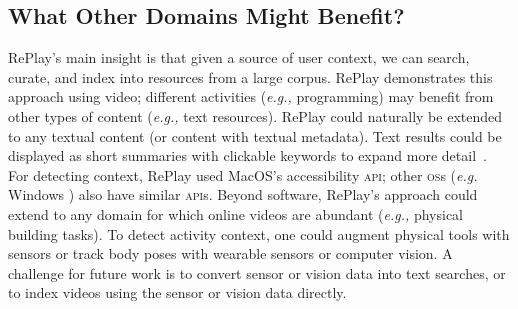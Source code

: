 \subsection{What Other Domains Might Benefit?}
RePlay's main insight is that given a source of user context, we can search, curate, and index into resources from a large corpus. RePlay demonstrates this approach using video; different activities (\textit{e.g.,} programming) may benefit from other types of content (\textit{e.g.,} text resources). RePlay could naturally be extended to any textual content (or content with textual metadata). Text results could be displayed as short summaries with clickable keywords to expand more detail~\cite{Ekstrand2011}. For detecting context, RePlay used Mac\-OS's accessibility \textsc{api}; other \textsc{os}s (\textit{e.g.} Windows \cite{Matejka2013}) also have similar \textsc{api}s. %
Beyond software, RePlay's approach could extend to any domain for which online videos are abundant (\textit{e.g.,} physical building tasks). To detect activity context, one could augment physical tools with sensors \cite{Schoop2016, Lukowicz2004} or track body poses with wearable sensors or computer vision. A challenge for future work is to convert sensor or vision data into text searches, or to index videos using the sensor or vision data directly. 




